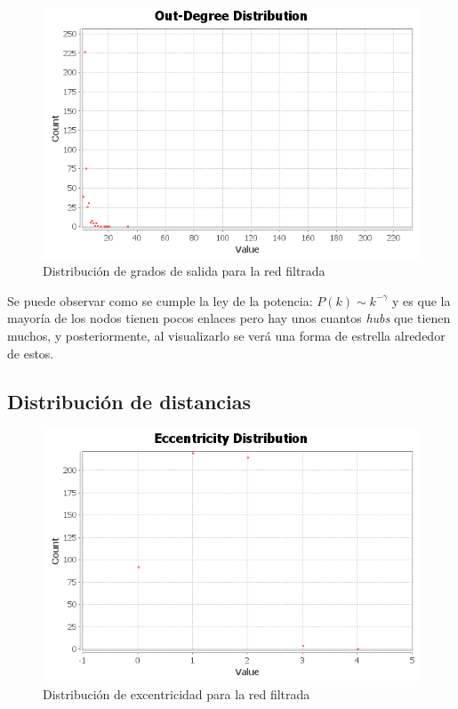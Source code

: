 \begin{figure}[H]
	\centering
	\includegraphics[width=12cm]{img/out-degree-distribution-filtered}
	\caption{Distribución de grados de salida para la red filtrada}
	\label{fig:out-degree-distribution-filtered}
\end{figure}

Se puede observar como se cumple la ley de la potencia: $ P(k) \sim k^{-\gamma} $ y es que la mayoría de los nodos tienen pocos enlaces pero hay unos cuantos \textit{hubs} que tienen muchos, y posteriormente, al visualizarlo se verá una forma de estrella alrededor de estos.

\subsection{Distribución de distancias}

\begin{figure}[H]
	\centering
	\includegraphics[width=12cm]{img/eccentricity-distribution-filtered}
	\caption{Distribución de excentricidad para la red filtrada}
	\label{fig:eccentricity-distribution-filtered}
\end{figure}

